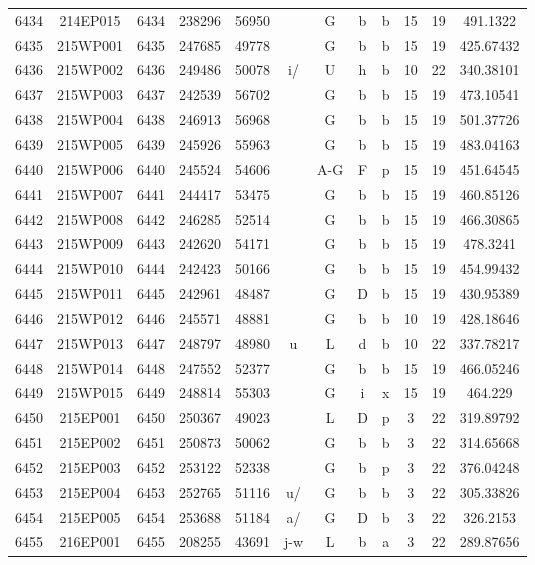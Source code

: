 \begin{tabular}{|*{12}{c|}}
6434 & 214EP015 & 6434 & 238296 & 56950 &  & G & b & b & 15 & 19 & 491.1322 \\ 
6435 & 215WP001 & 6435 & 247685 & 49778 &  & G & b & b & 15 & 19 & 425.67432 \\ 
6436 & 215WP002 & 6436 & 249486 & 50078 & i/ & U & h & b & 10 & 22 & 340.38101 \\ 
6437 & 215WP003 & 6437 & 242539 & 56702 &  & G & b & b & 15 & 19 & 473.10541 \\ 
6438 & 215WP004 & 6438 & 246913 & 56968 &  & G & b & b & 15 & 19 & 501.37726 \\ 
6439 & 215WP005 & 6439 & 245926 & 55963 &  & G & b & b & 15 & 19 & 483.04163 \\ 
6440 & 215WP006 & 6440 & 245524 & 54606 &  & A-G & F & p & 15 & 19 & 451.64545 \\ 
6441 & 215WP007 & 6441 & 244417 & 53475 &  & G & b & b & 15 & 19 & 460.85126 \\ 
6442 & 215WP008 & 6442 & 246285 & 52514 &  & G & b & b & 15 & 19 & 466.30865 \\ 
6443 & 215WP009 & 6443 & 242620 & 54171 &  & G & b & b & 15 & 19 & 478.3241 \\ 
6444 & 215WP010 & 6444 & 242423 & 50166 &  & G & b & b & 15 & 19 & 454.99432 \\ 
6445 & 215WP011 & 6445 & 242961 & 48487 &  & G & D & b & 15 & 19 & 430.95389 \\ 
6446 & 215WP012 & 6446 & 245571 & 48881 &  & G & b & b & 10 & 19 & 428.18646 \\ 
6447 & 215WP013 & 6447 & 248797 & 48980 & u & L & d & b & 10 & 22 & 337.78217 \\ 
6448 & 215WP014 & 6448 & 247552 & 52377 &  & G & b & b & 15 & 19 & 466.05246 \\ 
6449 & 215WP015 & 6449 & 248814 & 55303 &  & G & i & x & 15 & 19 & 464.229 \\ 
6450 & 215EP001 & 6450 & 250367 & 49023 &  & L & D & p & 3 & 22 & 319.89792 \\ 
6451 & 215EP002 & 6451 & 250873 & 50062 &  & G & b & b & 3 & 22 & 314.65668 \\ 
6452 & 215EP003 & 6452 & 253122 & 52338 &  & G & b & p & 3 & 22 & 376.04248 \\ 
6453 & 215EP004 & 6453 & 252765 & 51116 & u/ & G & b & b & 3 & 22 & 305.33826 \\ 
6454 & 215EP005 & 6454 & 253688 & 51184 & a/ & G & D & b & 3 & 22 & 326.2153 \\ 
6455 & 216EP001 & 6455 & 208255 & 43691 & j-w & L & b & a & 3 & 22 & 289.87656 \\ 

\end{tabular}
